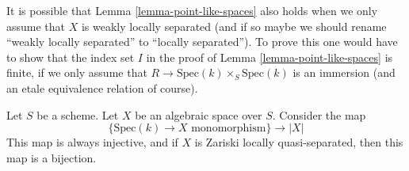 \begin{remark}
\label{remark-cannot-decide-yet}
It is possible that Lemma \ref{lemma-point-like-spaces}
also holds when we only assume that
$X$ is weakly locally separated (and if so maybe we should rename
``weakly locally separated'' to ``locally separated'').
To prove this one would have to show that the index set $I$ in the proof of
Lemma \ref{lemma-point-like-spaces} is
finite, if we only assume that $R \to \text{Spec}(k) \times_S \text{Spec}(k)$
is an immersion (and an etale equivalence relation of course).
\end{remark}

\begin{lemma}
\label{lemma-points-monomorphism}
Let $S$ be a scheme. Let $X$ be an algebraic space over $S$.
Consider the map
$$
\{\text{Spec}(k) \to X \text{ monomorphism}\}
\longrightarrow
|X|
$$
This map is always injective, and if $X$ is Zariski locally
quasi-separated, then this map is a bijection.
\end{lemma}

